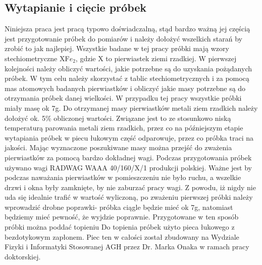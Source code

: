 \documentclass[a4paper,12pt]{article}
\numberwithin{equation}{section}
\begin{document}
\subsection{Wytapianie i cięcie próbek}
 	Niniejsza praca jest pracą typowo doświadczalną, stąd bardzo ważną jej częścią jest przygotowanie próbek do pomiarów i należy dołożyć wszelkich starań by zrobić to jak najlepiej. 
Wszystkie badane w tej pracy próbki mają wzory stechiometryczne XF${e}_2$, gdzie X to pierwiastek ziemi 
rzadkiej. W pierwszej kolejności należy obliczyć wartości, jakie potrzebne są do uzyskania pożądanych próbek. 
W tym celu należy skorzystać z tablic stechiometrycznych i za pomocą mas atomowych badanych pierwiastków i obliczyć 
jakie masy potrzebne są do otrzymania próbek danej wielkości. W  przypadku tej pracy wszystkie próbki miały masę ok 7g. Do
 otrzymanej masy pierwiastków metali ziem rzadkich należy dołożyć ok. 5\% obliczonej wartości. Związane jest to ze 
stosunkowo niską temperaturą parowania metali ziem rzadkich, przez co na późniejszym etapie wytapiania próbek w 
piecu łukowym część odparowuje, przez co próbka traci na jakości. Mając wyznaczone poszukiwane masy można 
przejść do zważenia pierwiastków za pomocą bardzo dokładnej wagi.
Podczas przygotowania próbek używano wagi RADWAG WAAA 40/160/X/1 produkcji polskiej.  Ważne jest by podczas 
naważania pierwiastków w pomieszczeniu nie było ruchu, a wszelkie drzwi i okna były zamknięte, by nie zaburzać pracy 
wagi. Z powodu, iż nigdy nie uda się idealnie trafić w wartość wyliczoną, po zważeniu pierwszej próbki należy 
wprowadzić drobne poprawki- próbka ciągle będzie mieć ok 7g, natomiast będziemy mieć pewność, że wyjdzie 
poprawnie. Przygotowane w ten sposób próbki można poddać topieniu
Do topienia próbek użyto pieca łukowego z bezdotykowym zapłonem. Piec ten w całości został zbudowany na 
Wydziale Fizyki i Informatyki Stosowanej AGH przez Dr. Marka Onaka  w ramach pracy doktorskiej. %
\end{document}
